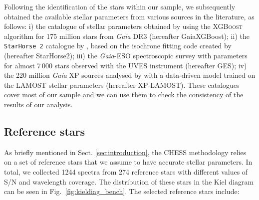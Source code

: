\documentclass{aa}
\begin{document}
Following the identification of the stars within our sample, we subsequently obtained the available stellar parameters from various sources in the literature, as follows: \noindent i) the catalogue of stellar parameters obtained by \citet{Andrae23xgboost} using the \textsc{XGBoost} algorithm for 175 million stars from \textit{Gaia} DR3 (hereafter GaiaXGBoost); ii) the \texttt{StarHorse 2} catalogue by \citet{Anders2022}, based on the isochrone fitting code created by \citet{2018MNRAS.476.2556Q} (hereafter StarHorse2); iii) the \textit{Gaia}-ESO spectroscopic survey with parameters for almost 7\,000 stars observed with the UVES instrument \citep{Hourihane2023, Worley2024} (hereafter GES); iv) the 220 million \textit{Gaia} XP sources analysed by \citet{2023MNRAS.524.1855Z} with a data-driven model trained on the LAMOST stellar parameters \citep{LAMOSTstellarparams} (hereafter XP-LAMOST). These catalogues cover most of our sample and we can use them to check the consistency of the results of our analysis.

\subsection{Reference stars}\label{sec:referencestars}

As briefly mentioned in Sect. \ref{sec:introduction}, the {\sf CHESS} methodology relies on a set of reference stars that we assume to have accurate stellar parameters. In total, we collected 1244 spectra from 274 reference stars with different values of S/N and wavelength coverage. The distribution of these stars in the Kiel diagram can be seen in Fig.~\ref{fig:kieldiag_bench}. The selected reference stars include:
\end{document}
